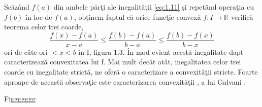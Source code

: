\documentclass[a4paper,12pt,oneside]{report}
\begin{document}
Sc\u{a}z\^{a}nd \(f\left ( a \right )\) din ambele p\u{a}r\c{t}i ale inegalit\u{a}\c{t}ii \ref{eq:1.11} \c{s}i repet\^{a}nd opera\c{t}ia cu \(f\left ( b \right )\) \^{i}n loc de \(f\left ( a \right )\), ob\c{t}inem faptul c\u{a} orice func\c{t}ie convex\u{a} \(f : I \rightarrow \mathbb{R}\) verific\u{a} teorema celor trei coarde, 
\begin{displaymath}
   \frac{f\left ( x \right ) - f\left ( a \right )}{x-a}\leq \frac{f\left ( b \right )- f\left ( a \right )}{b-a}\leq \frac{f\left ( b \right ) - f\left ( x \right )}{b-x} \label{eq:1.13} \tag{1.13}
\end{displaymath}
ori de c\^{a}te ori \(< x< b\) \^{i}n I, figura 1.3. \^{I}n mod evient acest\u{a} inegalitate dapt caracterizeaz\u{a} convexitatea lui f. Mai mult dec\^{a}t at\^{a}t, inegalitatea celor trei coarde cu inegalitate strict\u{a}, ne ofer\u{a} o caracterizare a convexit\u{a}\c{t}ii stricte. Foarte aproape de aceast\u{a} observa\c{t}ie este caracterizarea convexit\u{a}\c{t}ii , a lui Galvani .

Figgggggg
\end{document}
